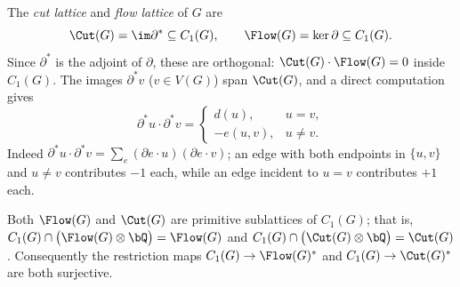The \emph{cut lattice} and \emph{flow lattice} of $G$ are
\[
\Cut(G)=\im\partial^\ast\subseteq C_1(G),
\qquad
\Flow(G)=\ker\partial\subseteq C_1(G).
\]
Since $\partial^\ast$ is the adjoint of $\partial$, these are orthogonal:
$\Cut(G)\cdot\Flow(G)=0$ inside $C_1(G)$.  The images $\partial^\ast v$ ($v\in V(G)$) span
$\Cut(G)$, and a direct computation gives
\begin{equation}
\label{eq:cob}
\partial^\ast u\cdot\partial^\ast v=
\begin{cases}
d(u), & u=v,\\
-e(u,v), & u\ne v.
\end{cases}
\end{equation}
Indeed $\partial^\ast u\cdot\partial^\ast v=\sum_e(\partial e\cdot u)(\partial e\cdot v)$;
an edge with both endpoints in $\{u,v\}$ and $u\ne v$ contributes $-1$ each, while an edge
incident to $u=v$ contributes $+1$ each.

\begin{lem}[Primitivity]
\label{lem:primitive}
Both $\Flow(G)$ and $\Cut(G)$ are primitive sublattices of $C_1(G)$; that is,
$C_1(G)\cap\bigl(\Flow(G)\otimes\bQ\bigr)=\Flow(G)$ and
$C_1(G)\cap\bigl(\Cut(G)\otimes\bQ\bigr)=\Cut(G)$.
Consequently the restriction maps $C_1(G)\to\Flow(G)^\ast$ and $C_1(G)\to\Cut(G)^\ast$ are
both surjective.
\end{lem}

